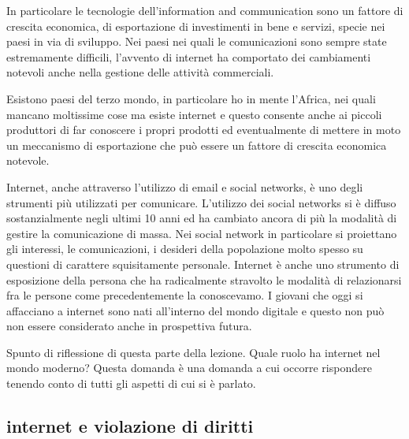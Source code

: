 In particolare le tecnologie dell'information and communication sono un fattore di crescita economica, di esportazione di investimenti in bene e servizi, specie nei paesi in via di sviluppo. Nei paesi nei quali le comunicazioni sono sempre state estremamente difficili, l'avvento di internet ha comportato dei cambiamenti notevoli anche nella gestione delle attività commerciali.\par
Esistono paesi del terzo mondo, in particolare ho in mente l'Africa, nei quali mancano moltissime cose ma esiste internet e questo consente anche ai piccoli produttori di far conoscere i propri prodotti ed eventualmente di mettere in moto un meccanismo di esportazione che può essere un fattore di crescita economica notevole. \par
Internet, anche attraverso l'utilizzo di email e social networks, è uno degli strumenti più utilizzati per comunicare. L'utilizzo dei social networks si è diffuso sostanzialmente negli ultimi 10 anni ed ha cambiato ancora di più la modalità di gestire la comunicazione di massa. Nei social network in particolare si proiettano gli interessi, le comunicazioni, i desideri della popolazione molto spesso su questioni di carattere squisitamente personale. Internet è  anche uno strumento di esposizione della persona che ha radicalmente stravolto le modalità di relazionarsi fra le persone come precedentemente la conoscevamo. I giovani che oggi si affacciano a internet sono nati all'interno del mondo digitale e questo non può non essere considerato anche in prospettiva futura.\par 
Spunto di riflessione di questa parte della lezione. Quale ruolo ha internet nel mondo moderno? Questa domanda è una domanda a cui occorre rispondere tenendo conto di tutti gli aspetti di cui si è parlato. \par

\subsection{internet e violazione di diritti}

